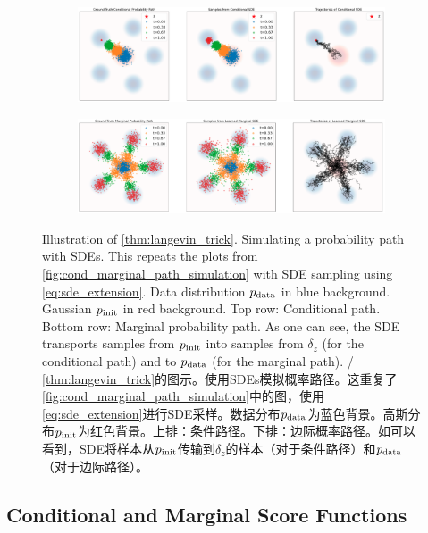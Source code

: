 \begin{figure}[t!]
\centering
   \begin{subfigure}[b]{\textwidth}
   \centering
   \includegraphics[width=\textwidth]{figures/conditional_sde.png}
   \label{fig:Ng1} 
\end{subfigure}
\begin{subfigure}[b]{\textwidth}
    \centering
   \includegraphics[width=\textwidth]{figures/marginal_sde.png}
   \label{fig:Ng2}
\end{subfigure}
\caption{\label{fig:thm_sde_extension}Illustration of \cref{thm:langevin_trick}. Simulating a probability path with SDEs. This repeats the plots from \cref{fig:cond_marginal_path_simulation} with SDE sampling using \cref{eq:sde_extension}. Data distribution $p_{\rm{data}}$ in blue background. Gaussian $p_{\rm{init}}$ in red background. Top row: Conditional path. Bottom row: Marginal probability path. As one can see, the SDE transports samples from $p_{\rm{init}}$ into samples from $\delta_{z}$ (for the conditional path) and to $p_{\rm{data}}$ (for the marginal path). / \cref{thm:langevin_trick}的图示。使用SDEs模拟概率路径。这重复了\cref{fig:cond_marginal_path_simulation}中的图，使用\cref{eq:sde_extension}进行SDE采样。数据分布$p_{\rm{data}}$为蓝色背景。高斯分布$p_{\rm{init}}$为红色背景。上排：条件路径。下排：边际概率路径。如可以看到，SDE将样本从$p_{\rm{init}}$传输到$\delta_{z}$的样本（对于条件路径）和$p_{\rm{data}}$（对于边际路径）。}
\end{figure}

\subsection{Conditional and Marginal Score Functions}

